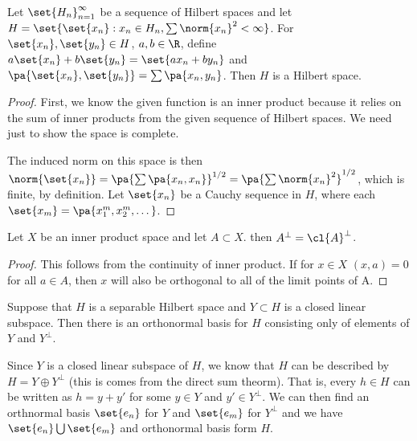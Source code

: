 \documentclass[12pt,letterpaper,twoside]{hmcpset}
\begin{document}
\begin{problem}[3][20]
 Let $\set{H_n}_{n=1}^\infty$ be a sequence of Hilbert spaces and let $H = \set{\set{x_n} : x_n \in H_n, \sum\norm{x_n}^2 < \infty}$. For $\set{x_n},\set{y_n} \in H$, $a,b \in \R$, define $a\set{x_n} + b\set{y_n} = \set{ax_n + by_n}$ and $\pa{\set{x_n},\set{y_n}} = \sum\pa{x_n,y_n}$. Then $H$ is a Hilbert space.
\end{problem}

\begin{solution}
 \begin{proof}
  First, we know the given function is an inner product because it relies on 
the sum of inner products from the given sequence of Hilbert spaces.  We need 
just to show the space is complete.
  
  The induced norm on this space is then $\norm{\set{x_n}} = \pa{\sum\pa{x_n,x_n}}^{1/2} = \pa{\sum\norm{x_n}^2}^{1/2}$, which is finite, by definition. Let $\set{x_n}$ be a Cauchy sequence in $H$, where each $\set{x_m} = \pa{x_1^m, x_2^m, \dotsc}$.
 \end{proof}

\end{solution}


\begin{problem}[4][10]
 Let $X$ be an inner product space and let $A \subset X$. then $A^\perp = \cl{A}^\perp$.
\end{problem}

\begin{solution}
 \begin{proof}
  This follows from the continuity of inner product. If for $x \in X$ $(x,a) = 0$ for all $a \in A$, then $x$ will also be orthogonal to all of the limit points of A.
 \end{proof}

\end{solution}


\begin{problem}[5][10]
 Suppose that $H$ is a separable Hilbert space and $Y \subset H$ is a closed 
linear subspace. Then there is an orthonormal basis for $H$ consisting only of 
elements of $Y$ and $Y^\perp$.
\end{problem}

\begin{solution}
 Since $Y$ is a closed linear subspace of $H$, we know that $H$ can be 
described by $H = Y \oplus Y^\perp$ (this is comes from the direct sum theorm). 
That is, every $h \in H$ can be written as $h = y + y'$ for some $y \in Y$ and 
$y' \in Y^\perp$.  We can then find an orthnormal basis $\set{e_n}$ for $Y$ and 
$\set{e_m}$ for $Y^\perp$ and we have $\set{e_n} \bigcup \set{e_m}$ and 
orthonormal basis form $H$.
\end{solution}
\end{document}
